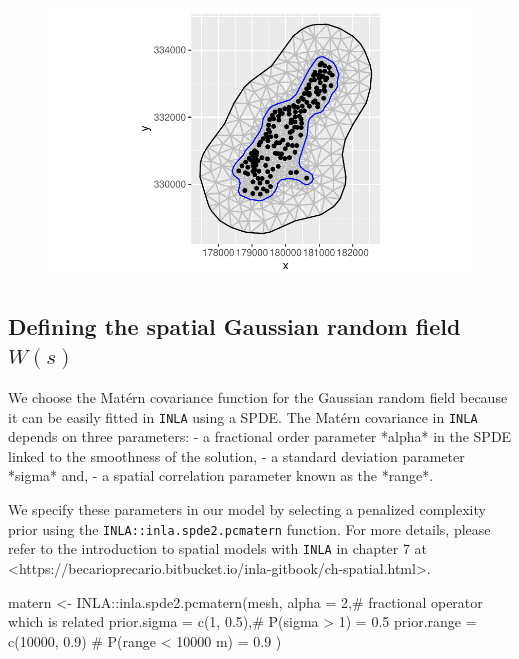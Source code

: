 \documentclass[
  a4paper,
]{article}
\newenvironment{Shaded}{\begin{snugshade}}{\end{snugshade}}
\newcommand{\AttributeTok}[1]{\textcolor[rgb]{0.40,0.45,0.13}{#1}}
\newcommand{\CommentTok}[1]{\textcolor[rgb]{0.37,0.37,0.37}{#1}}
\newcommand{\DecValTok}[1]{\textcolor[rgb]{0.68,0.00,0.00}{#1}}
\newcommand{\FloatTok}[1]{\textcolor[rgb]{0.68,0.00,0.00}{#1}}
\newcommand{\FunctionTok}[1]{\textcolor[rgb]{0.28,0.35,0.67}{#1}}
\newcommand{\NormalTok}[1]{\textcolor[rgb]{0.00,0.23,0.31}{#1}}
\newcommand{\OtherTok}[1]{\textcolor[rgb]{0.00,0.23,0.31}{#1}}
\newcommand{\SpecialCharTok}[1]{\textcolor[rgb]{0.37,0.37,0.37}{#1}}
\begin{document}
\begin{figure}[H]

{\centering \includegraphics{pedometron_files/figure-pdf/unnamed-chunk-4-1.pdf}

}

\end{figure}

\hypertarget{defining-the-spatial-gaussian-random-field-ws}{%
\subsection{\texorpdfstring{Defining the spatial Gaussian random field
\(W(s)\)}{Defining the spatial Gaussian random field W(s)}}\label{defining-the-spatial-gaussian-random-field-ws}}

We choose the Matérn covariance function for the Gaussian random field
because it can be easily fitted in \texttt{INLA} using a SPDE. The
Matérn covariance in \texttt{INLA} depends on three parameters: - a
fractional order parameter *alpha* in the SPDE linked to the smoothness
of the solution, - a standard deviation parameter *sigma* and, - a
spatial correlation parameter known as the *range*.

We specify these parameters in our model by selecting a penalized
complexity prior using the \texttt{INLA::inla.spde2.pcmatern} function.
For more details, please refer to the introduction to spatial models
with \texttt{INLA} in chapter 7 at
\textless https://becarioprecario.bitbucket.io/inla-gitbook/ch-spatial.html\textgreater.

\begin{Shaded}
\begin{Highlighting}[]
\NormalTok{matern }\OtherTok{\textless{}{-}}
\NormalTok{  INLA}\SpecialCharTok{::}\FunctionTok{inla.spde2.pcmatern}\NormalTok{(mesh,}
                      \AttributeTok{alpha =} \DecValTok{2}\NormalTok{,}\CommentTok{\# fractional operator which is related}
                      \AttributeTok{prior.sigma =} \FunctionTok{c}\NormalTok{(}\DecValTok{1}\NormalTok{, }\FloatTok{0.5}\NormalTok{),}\CommentTok{\# P(sigma \textgreater{} 1) = 0.5}
                      \AttributeTok{prior.range =} \FunctionTok{c}\NormalTok{(}\DecValTok{10000}\NormalTok{, }\FloatTok{0.9}\NormalTok{)  }\CommentTok{\# P(range \textless{} 10000 m) = 0.9}
\NormalTok{  )}
\end{Highlighting}
\end{Shaded}
\end{document}
